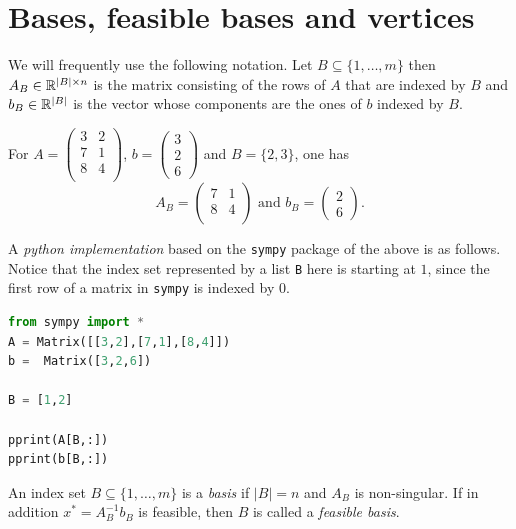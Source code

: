 \section{Bases, feasible bases and vertices}
\label{sec:non-degenerate-case}

We will frequently use the following notation. Let $B \subseteq \{1,\dots,m\}$ then $A_B \in \mathbb{R}^{|B| \times n}$ is the matrix consisting of the rows of $A$ that are indexed by   $B$ and $b_B \in \mathbb{R}^{|B|}$  is the vector whose components are the ones of $b$ indexed by $B$.


\begin{example}
  \label{ex;pyth-1}
For 
$    A = 
    \begin{pmatrix}
      3 & 2  \\
      7 & 1\\
      8 & 4\\
    \end{pmatrix}$,  $b = 
    \begin{pmatrix}
      3 \\ 2\\ 6
    \end{pmatrix}$ 
    and  $B = \{2,3\}$, one has
    \begin{displaymath}
    A_B =  \begin{pmatrix}
          7 & 1\\
      8 & 4\\
    \end{pmatrix} \text{ and }  b_B = 
    \begin{pmatrix}
      2\\ 6
    \end{pmatrix}.          
    \end{displaymath}

\medskip
\noindent     
A \emph{python implementation} based on the {\tt sympy} package of the above is as follows. Notice that the index set represented by a list {\tt B} here is starting at $1$, since the first row of a matrix in {\tt sympy} is indexed by $0$.  
\begin{lstlisting}[language=python]
from sympy import *
A = Matrix([[3,2],[7,1],[8,4]])
b =  Matrix([3,2,6])

B = [1,2]

pprint(A[B,:])
pprint(b[B,:]) 
\end{lstlisting}
\end{example}


    \begin{definition}
      \label{def:s1-1}
      An index set $B \subseteq \{1,\dots,m\}$ is a \emph{basis} if
      $|B| = n$ and $A_B$ is non-singular. If in addition $x^* =
      A_B^{-1} b_B$ is feasible, then $B$ is called a \emph{feasible
        basis}.
    \end{definition}

